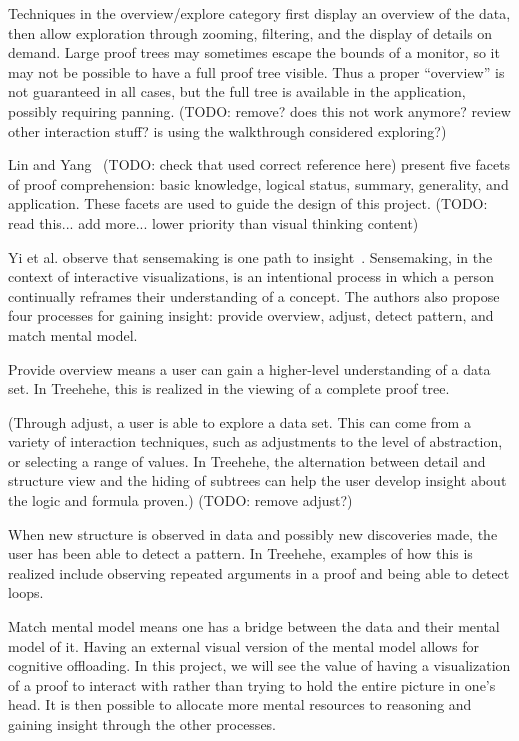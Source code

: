 \documentclass[conference]{IEEEtran}
\newcommand{\projectname}{Treehehe}
\begin{document}
Techniques in the overview/explore category first display an overview of the data, then allow exploration through zooming, filtering, and the display of details on demand. Large proof trees may sometimes escape the bounds of a monitor, so it may not be possible to have a full proof tree visible. Thus a proper ``overview'' is not guaranteed in all cases, but the full tree is available in the application, possibly requiring panning. (TODO: remove? does this not work anymore? review other interaction stuff? is using the walkthrough considered exploring?)

Lin and Yang~\cite{readingcompgeometric-lin+yang} (TODO: check that used correct reference here) present five facets of proof comprehension: basic knowledge, logical status, summary, generality, and application. These facets are used to guide the design of this project. (TODO: read this... add more... lower priority than visual thinking content)

Yi et al. observe that sensemaking is one path to insight~\cite{insights-yi+etal}. Sensemaking, in the context of interactive visualizations, is an intentional process in which a person continually reframes their understanding of a concept. The authors also propose four processes for gaining insight: provide overview, adjust, detect pattern, and match mental model.

Provide overview means a user can gain a higher-level understanding of a data set. In \projectname{}, this is realized in the viewing of a complete proof tree.

(Through adjust, a user is able to explore a data set. This can come from a variety of interaction techniques, such as adjustments to the level of abstraction, or selecting a range of values. In \projectname{}, the alternation between detail and structure view and the hiding of subtrees can help the user develop insight about the logic and formula proven.) (TODO: remove adjust?)

When new structure is observed in data and possibly new discoveries made, the user has been able to detect a pattern. In \projectname{}, examples of how this is realized include observing repeated arguments in a proof and being able to detect loops.

Match mental model means one has a bridge between the data and their mental model of it. Having an external visual version of the mental model allows for cognitive offloading. In this project, we will see the value of having a visualization of a proof to interact with rather than trying to hold the entire picture in one’s head. It is then possible to allocate more mental resources to reasoning and gaining insight through the other processes.
\end{document}
